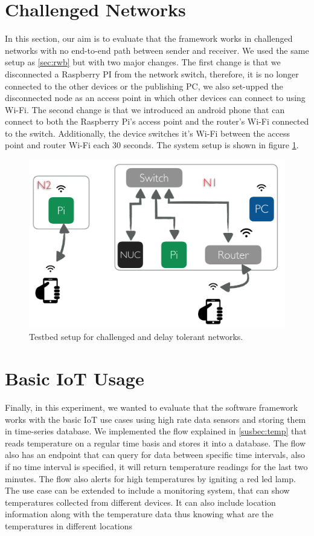 \section{Challenged Networks}
In this section, our aim is to evaluate that the framework works in challenged networks with no end-to-end path between  sender and receiver. We used the same setup as \ref{sec:rwb} but with two major changes. The first change is that we disconnected  a Raspberry PI from the network switch, therefore, it is no longer connected to the other devices or the publishing PC, we also set-upped the disconnected node as an access point in which other devices can connect to using Wi-Fi. The second change is that we introduced an android phone that can connect to both the Raspberry Pi's access point and the router's Wi-Fi connected to the switch. Additionally, the device switches it's Wi-Fi between the access point and router Wi-Fi each 30 seconds. The system setup is shown in figure \ref{fig:tb-dtn}.
\begin{figure}[H]
	\centering
	\includegraphics[scale=0.6]{images/tb-dtn.png}
	\caption{Testbed setup for challenged and delay tolerant networks.}
	\label{fig:tb-dtn}
\end{figure} 

\section{Basic IoT Usage}

Finally, in this experiment, we wanted to evaluate that the software framework works with the basic IoT use cases using high rate data sensors and storing them in time-series database.  We implemented the flow explained in \ref{susbec:temp} that reads temperature on a regular time basis and stores it into a database. The flow also has an endpoint that can query for data between specific time intervals, also if no time interval is specified, it will return temperature readings for the last two minutes. The flow also alerts for high temperatures by igniting a red led lamp. The use case can be extended to include a monitoring system, that can show temperatures collected from different devices. It can also include location information along with the temperature data thus knowing what are the temperatures in different locations 